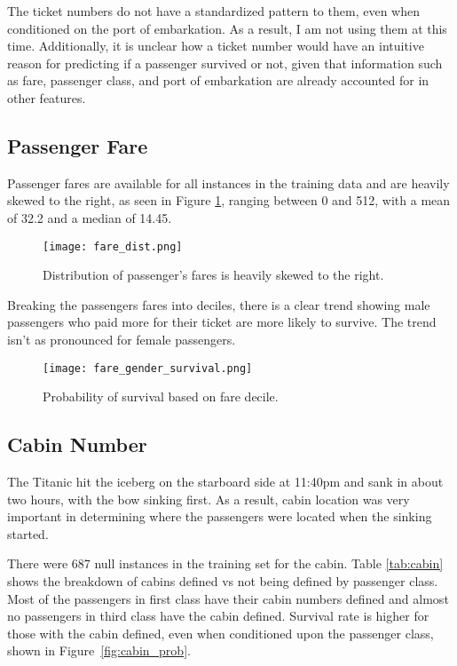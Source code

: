 \documentclass[12pt, letterpaper]{article}
\begin{document}
The ticket numbers do not have a standardized pattern to them, even when conditioned on the port of embarkation. As a result, I am not using them at this time. Additionally, it is unclear how a ticket number would have an intuitive reason for predicting if a passenger survived or not, given that information such as fare, passenger class, and port of embarkation are already accounted for in other features.

\subsection{Passenger Fare}

Passenger fares are available for all instances in the training data and are heavily skewed to the right, as seen in Figure  \ref{fig:fare_dist}, ranging between 0 and 512, with a mean of 32.2 and a median of 14.45.

\begin{figure}[H]
    \centering
    \texttt{[image: fare\_dist.png]}
    \caption{Distribution of passenger's fares is heavily skewed to the right.}
    \label{fig:fare_dist}
\end{figure}

Breaking the passengers fares into deciles, there is a clear trend showing male passengers who paid more for their ticket are more likely to survive. The trend isn't as pronounced for female passengers.

\begin{figure}[H]
    \centering
    \texttt{[image: fare\_gender\_survival.png]}
    \caption{Probability of survival based on fare decile.}
    \label{fig:fare_survival}
\end{figure}


\subsection{Cabin Number}

The Titanic hit the iceberg on the starboard side at 11:40pm and sank in about two hours, with the bow sinking first. As a result, cabin location was very important in determining where the passengers were located when the sinking started.

There were 687 null instances in the training set for the cabin. Table \ref{tab:cabin} shows the breakdown of cabins defined vs not being defined by passenger class. Most of the passengers in first class have their cabin numbers defined and almost no passengers in third class have the cabin defined. Survival rate is higher for those with the cabin defined, even when conditioned upon the passenger class, shown in Figure~\ref{fig:cabin_prob}.
\end{document}
